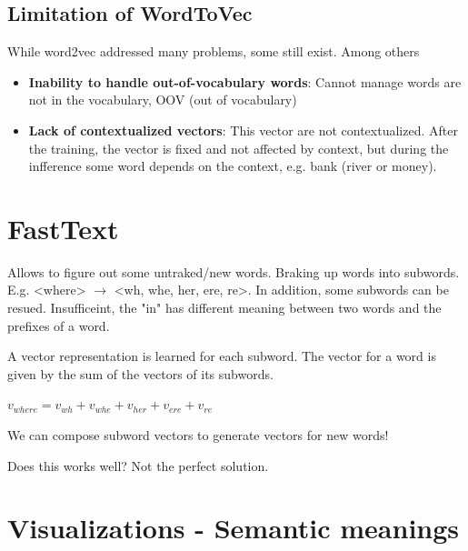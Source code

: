 \subsection{Limitation of WordToVec}


While word2vec addressed many problems, some still exist. Among
others

\begin{itemize}
  \item \textbf{Inability to handle out-of-vocabulary words}: Cannot manage words are not in the vocabulary, OOV (out of vocabulary)
  \item \textbf{Lack of contextualized vectors}: This vector are not contextualized. After the training, the vector is fixed and not affected by context, but during the infference some word depends on the context, e.g. bank (river or money).
\end{itemize}


\section{FastText}

Allows to figure out some untraked/new words. Braking up words into subwords. E.g. <where> $\to$  <wh, whe, her, ere, re>. In addition, some subwords can be resued.
Insufficeint, the "in" has different meaning between two words and the prefixes of a word.


A vector representation is learned for each subword. The vector for a word is given by the sum of the vectors of its subwords.

$v_{where} = v_{wh} + v_{whe} + v_{her} + v_{ere} + v_{re}$

We can compose subword vectors to generate vectors for new words!

Does this works well? Not the perfect solution.


\section{Visualizations - Semantic meanings}


